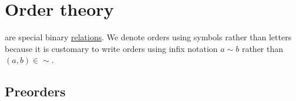 \section{Order theory}\label{sec:order_theory}

\begin{remark}\label{remark:order_infix_notation}
   are special binary \hyperref[def:binary_relation]{relations}. We denote orders using symbols rather than letters because it is customary to write orders using infix notation \( a \sim b \) rather than \( (a, b) \in \sim \).
\end{remark}

\subsection{Preorders}\label{subsec:preorders}

